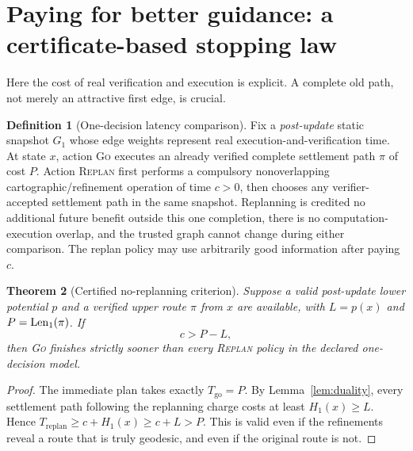 \documentclass[11pt]{article}
\newtheorem{theorem}{Theorem}[section]
\theoremstyle{definition}\newtheorem{definition}[theorem]{Definition}\newtheorem{assumption}[theorem]{Assumption}
\theoremstyle{remark}\newtheorem{remark}[theorem]{Remark}
\begin{document}
\section{Paying for better guidance: a certificate-based stopping law}
\label{sec:economics}
Here the cost of real verification and execution is explicit. A complete old path, not merely an attractive first edge, is crucial.
\begin{definition}[One-decision latency comparison]\label{def:latmodel}
Fix a \emph{post-update} static snapshot $G_1$ whose edge weights represent real execution-and-verification time. At state $x$, action \textsc{Go} executes an already verified complete settlement path $\pi$ of cost $P$. Action \textsc{Replan} first performs a compulsory nonoverlapping cartographic/refinement operation of time $c>0$, then chooses any verifier-accepted settlement path in the same snapshot. Replanning is credited no additional future benefit outside this one completion, there is no computation-execution overlap, and the trusted graph cannot change during either comparison. The replan policy may use arbitrarily good information after paying $c$.
\end{definition}
\begin{theorem}[Certified no-replanning criterion]\label{thm:latency}
Suppose a valid post-update lower potential $p$ and a verified upper route $\pi$ from $x$ are available, with $L=p(x)$ and $P=\operatorname{Len}_1(\pi)$. If
\[
\boxed{c>P-L,}
\]
then \textsc{Go} finishes strictly sooner than \emph{every} \textsc{Replan} policy in the declared one-decision model.
\end{theorem}
\begin{proof}
The immediate plan takes exactly $T_{\mathrm{go}}=P$. By Lemma~\ref{lem:duality}, every settlement path following the replanning charge costs at least $H_1(x)\geq L$. Hence $T_{\mathrm{replan}}\geq c+H_1(x)\geq c+L>P$. This is valid even if the refinements reveal a route that is truly geodesic, and even if the original route is not.
\end{proof}
\par
\end{document}
